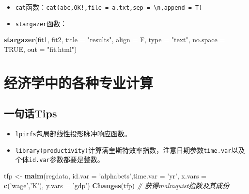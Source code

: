 \documentclass[
]{book}
\newenvironment{Shaded}{\begin{snugshade}}{\end{snugshade}}
\newcommand{\CommentTok}[1]{\textcolor[rgb]{0.56,0.35,0.01}{\textit{#1}}}
\newcommand{\DataTypeTok}[1]{\textcolor[rgb]{0.13,0.29,0.53}{#1}}
\newcommand{\KeywordTok}[1]{\textcolor[rgb]{0.13,0.29,0.53}{\textbf{#1}}}
\newcommand{\NormalTok}[1]{#1}
\newcommand{\OtherTok}[1]{\textcolor[rgb]{0.56,0.35,0.01}{#1}}
\newcommand{\StringTok}[1]{\textcolor[rgb]{0.31,0.60,0.02}{#1}}
\providecommand{\tightlist}{%
  \setlength{\itemsep}{0pt}\setlength{\parskip}{0pt}}
\begin{document}
\begin{itemize}
\tightlist
\item
  \texttt{cat}函数：\texttt{cat(\textquotesingle{}abc\textquotesingle{},\textquotesingle{}OK!\textquotesingle{},file\ =\ \textquotesingle{}a.txt\textquotesingle{},sep\ =\ \textquotesingle{}\textbackslash{}n\textquotesingle{},append\ =\ T)}
\item
  \texttt{stargazer}函数：
\end{itemize}

\begin{Shaded}
\begin{Highlighting}[]
\KeywordTok{stargazer}\NormalTok{(fit1, fit2, }\DataTypeTok{title =} \StringTok{"results"}\NormalTok{, }\DataTypeTok{align =}\NormalTok{ F, }\DataTypeTok{type =} \StringTok{"text"}\NormalTok{, }\DataTypeTok{no.space =} \OtherTok{TRUE}\NormalTok{, }\DataTypeTok{out =} \StringTok{"fit.html"}\NormalTok{)}
\end{Highlighting}
\end{Shaded}

\hypertarget{Eco}{%
\chapter{经济学中的各种专业计算}\label{Eco}}

\hypertarget{ux4e00ux53e5ux8bddtips-4}{%
\section{一句话Tips}\label{ux4e00ux53e5ux8bddtips-4}}

\begin{itemize}
\tightlist
\item
  \texttt{lpirfs}包局部线性投影脉冲响应函数。
\item
  \texttt{library(productivity)}计算满奎斯特效率指数，注意日期参数\texttt{time.var}以及个体\texttt{id.var}参数都要是整数。
\end{itemize}

\begin{Shaded}
\begin{Highlighting}[]
\NormalTok{tfp <-}\StringTok{ }\KeywordTok{malm}\NormalTok{(regdata, }\DataTypeTok{id.var =} \StringTok{'alphabets'}\NormalTok{,}\DataTypeTok{time.var =} \StringTok{'yr'}\NormalTok{, }\DataTypeTok{x.vars =} \KeywordTok{c}\NormalTok{(}\StringTok{'wage'}\NormalTok{,}\StringTok{'K'}\NormalTok{), }\DataTypeTok{y.vars =} \StringTok{'gdp'}\NormalTok{)}
\KeywordTok{Changes}\NormalTok{(tfp) }\CommentTok{# 获得malmquist指数及其成份}
\end{Highlighting}
\end{Shaded}
\end{document}
